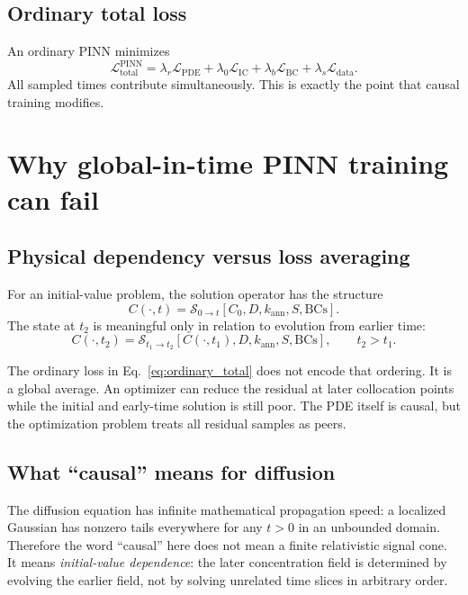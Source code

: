\documentclass[11pt]{article}
\newcommand{\Lpde}{\mathcal{L}_{\mathrm{PDE}}}
\newcommand{\Lic}{\mathcal{L}_{\mathrm{IC}}}
\newcommand{\Lbc}{\mathcal{L}_{\mathrm{BC}}}
\newcommand{\Ldata}{\mathcal{L}_{\mathrm{data}}}
\newcommand{\Ltotal}{\mathcal{L}_{\mathrm{total}}}
\begin{document}
\subsection{Ordinary total loss}

An ordinary PINN minimizes
\begin{equation}
\Ltotal^{\mathrm{PINN}}
=
\lambda_r\Lpde
+\lambda_0\Lic
+\lambda_b\Lbc
+\lambda_s\Ldata.
\label{eq:ordinary_total}
\end{equation}
All sampled times contribute simultaneously. This is exactly the point that causal training modifies.

\section{Why global-in-time PINN training can fail}

\subsection{Physical dependency versus loss averaging}

For an initial-value problem, the solution operator has the structure
\begin{equation}
C(\cdot,t)
=
\mathcal{S}_{0\rightarrow t}
\left[
C_0,D,k_{\mathrm{ann}},S,\text{BCs}
\right].
\end{equation}
The state at $t_2$ is meaningful only in relation to evolution from earlier time:
\begin{equation}
C(\cdot,t_2)
=
\mathcal{S}_{t_1\rightarrow t_2}
\left[
C(\cdot,t_1),D,k_{\mathrm{ann}},S,\text{BCs}
\right],
\qquad
t_2>t_1.
\end{equation}

The ordinary loss in Eq.~\eqref{eq:ordinary_total} does not encode that ordering. It is a global average. An optimizer can reduce the residual at later collocation points while the initial and early-time solution is still poor. The PDE itself is causal, but the optimization problem treats all residual samples as peers.

\subsection{What ``causal'' means for diffusion}

The diffusion equation has infinite mathematical propagation speed: a localized Gaussian has nonzero tails everywhere for any $t>0$ in an unbounded domain. Therefore the word ``causal'' here does not mean a finite relativistic signal cone. It means \emph{initial-value dependence}: the later concentration field is determined by evolving the earlier field, not by solving unrelated time slices in arbitrary order.
\end{document}
